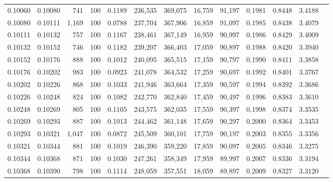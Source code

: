\begin{tabular}{rrrrrrrrrrrrr}
0.10060 & 0.10080 &   741 & 100 &                                     0.1189 & 236,535 & 369,075 &  16,759 &  91,197 & 0.1981 & 0.8448 & 3.4188 \\
0.10080 & 0.10111 & 1,169 & 100 &                                     0.0788 & 237,704 & 367,906 &  16,859 &  91,097 & 0.1985 & 0.8438 & 3.4079 \\
0.10111 & 0.10132 &   757 & 100 &                                     0.1167 & 238,461 & 367,149 &  16,959 &  90,997 & 0.1986 & 0.8429 & 3.4009 \\
0.10132 & 0.10152 &   746 & 100 &                                     0.1182 & 239,207 & 366,403 &  17,059 &  90,897 & 0.1988 & 0.8420 & 3.3940 \\
0.10152 & 0.10176 &   888 & 100 &                                     0.1012 & 240,095 & 365,515 &  17,159 &  90,797 & 0.1990 & 0.8411 & 3.3858 \\
0.10176 & 0.10202 &   983 & 100 &                                     0.0923 & 241,078 & 364,532 &  17,259 &  90,697 & 0.1992 & 0.8401 & 3.3767 \\
0.10202 & 0.10226 &   868 & 100 &                                     0.1033 & 241,946 & 363,664 &  17,359 &  90,597 & 0.1994 & 0.8392 & 3.3686 \\
0.10226 & 0.10248 &   824 & 100 &                                     0.1082 & 242,770 & 362,840 &  17,459 &  90,497 & 0.1996 & 0.8383 & 3.3610 \\
0.10248 & 0.10269 &   805 & 100 &                                     0.1105 & 243,575 & 362,035 &  17,559 &  90,397 & 0.1998 & 0.8374 & 3.3535 \\
0.10269 & 0.10293 &   887 & 100 &                                     0.1013 & 244,462 & 361,148 &  17,659 &  90,297 & 0.2000 & 0.8364 & 3.3453 \\
0.10293 & 0.10321 & 1,047 & 100 &                                     0.0872 & 245,509 & 360,101 &  17,759 &  90,197 & 0.2003 & 0.8355 & 3.3356 \\
0.10321 & 0.10344 &   881 & 100 &                                     0.1019 & 246,390 & 359,220 &  17,859 &  90,097 & 0.2005 & 0.8346 & 3.3275 \\
0.10344 & 0.10368 &   871 & 100 &                                     0.1030 & 247,261 & 358,349 &  17,959 &  89,997 & 0.2007 & 0.8336 & 3.3194 \\
0.10368 & 0.10390 &   798 & 100 &                                     0.1114 & 248,059 & 357,551 &  18,059 &  89,897 & 0.2009 & 0.8327 & 3.3120 \\

\end{tabular}
